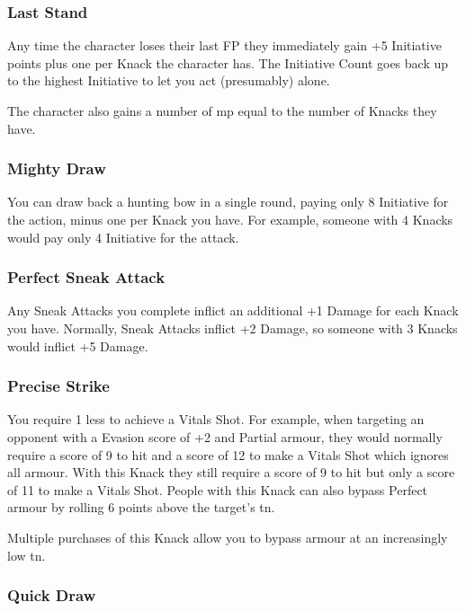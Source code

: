 \documentclass[titlepage,a4paper,openany]{book}
\begin{document}
\begin{multicols}{2}
\subsubsection{Last Stand}

Any time the character loses their last FP they immediately gain +5 Initiative points plus one per Knack the character has. The Initiative Count goes back up to the highest Initiative to let you act (presumably) alone.

The character also gains a number of \gls{mp} equal to the number of Knacks they have.

\subsubsection{Mighty Draw}

You can draw back a hunting bow in a single \gls{round}, paying only 8 Initiative for the action, minus one per Knack you have. For example, someone with 4 Knacks would pay only 4 Initiative for the attack.

\subsubsection{Perfect Sneak Attack}

Any Sneak Attacks you complete inflict an additional +1 Damage for each Knack you have. Normally, Sneak Attacks inflict +2 Damage, so someone with 3 Knacks would inflict +5 Damage.

\subsubsection{Precise Strike}\label{precisestrike}

You require 1 less to achieve a Vitals Shot. For example, when targeting an opponent with a Evasion score of +2 and Partial armour, they would normally require a score of 9 to hit and a score of 12 to make a Vitals Shot which ignores all armour. With this Knack they still require a score of 9 to hit but only a score of 11 to make a Vitals Shot. People with this Knack can also bypass Perfect armour by rolling 6 points above the target's \gls{tn}.

Multiple purchases of this Knack allow you to bypass armour at an increasingly low \gls{tn}.

\subsubsection{Quick Draw}


\end{multicols}
\end{document}
